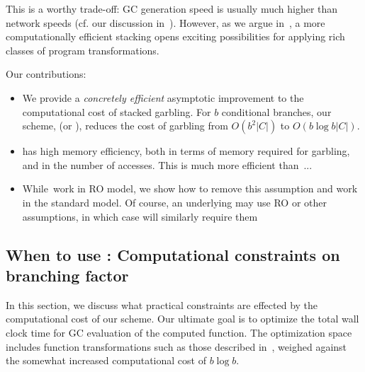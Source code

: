 This is a worthy trade-off: GC generation speed is usually much higher than network speeds (cf. our discussion in~).  However, as we argue in~, 
a more computationally efficient stacking
opens exciting possibilities for applying rich classes of program transformations.   




\medskip
Our contributions:
\begin{itemize}
	\item We provide a {\em concretely efficient}  asymptotic  improvement to the computational cost of stacked garbling.  For $b$ conditional branches, our scheme, \ourschemelong (or \ourscheme),  reduces the cost of garbling  from $O(b^2|C|)$ to $O(b \log b |C|)$. 
	\item \ourschemelong has high memory efficiency, both in terms of memory required for garbling, and in the number of accesses.   This is much more efficient than~\HK... 
	\item While~\HK work in RO model, we show how to remove this assumption and work in the standard model. Of course, an underlying \underscheme may use RO or other assumptions, in which case \ourschemelong will similarly require them
\end{itemize}














\subsection{When to use \ourscheme: Computational constraints on branching factor}
\label{sec:whentouse}

In this section, we discuss what practical constraints are effected by the computational cost of our scheme.  
Our ultimate goal is to optimize the total wall clock time for GC evaluation of the computed function.  The optimization space includes function transformations such as those described in~, weighed against the somewhat increased computational cost of $b\log b$.


